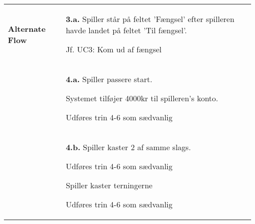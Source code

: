 \documentclass[class=article, crop=false]{standalone}
\begin{document}
\begin{table}[H]
\begin{tabularx}{\textwidth}{|l|X|}
    \textbf{Alternate Flow}   & \textbf{3.a.} Spiller står på feltet 'Fængsel' efter spilleren havde landet på feltet 'Til fængsel'.
    \begin{enumerate} \begin{tabenum}
                          \item Jf. UC3: Kom ud af fængsel
    \end{tabenum} \end{enumerate}
    \\



                              & \textbf{4.a.} Spiller passere start.
                                \begin{enumerate} \begin{tabenum}
                                        \item Systemet tilføjer 4000kr til spilleren's konto.
                                        \item Udføres trin 4-6 som sædvanlig
                                    \end{tabenum} \end{enumerate}
                                 \\
                              & \textbf{4.b.} Spiller kaster 2 af samme slags.
            \begin{enumerate} \begin{tabenum}
                                  \item Udføres trin 4-6 som sædvanlig
                                  \item Spiller kaster terningerne
                                  \item Udføres trin 4-6 som sædvanlig
            \end{tabenum} \end{enumerate}
            \\





\end{tabularx}
\end{table}
\end{document}
